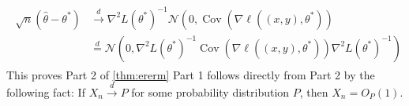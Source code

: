 \documentclass{article}
\begin{document}
\begin{align*}
\begin{aligned}
\sqrt{n}\left(\hat{\theta}-\theta^{*}\right) & \stackrel{d}{\rightarrow} \nabla^{2} L\left(\theta^{*}\right)^{-1} \mathcal{N}\left(0, \operatorname{Cov}\left(\nabla\ell\left((x, y), \theta^{*}\right)\right)\right.\\
& \stackrel{d}{=} \mathcal{N}\left(0, \nabla^{2} L\left(\theta^{*}\right)^{-1} \operatorname{Cov}\left(\nabla\ell\left((x, y), \theta^{*}\right)\right) \nabla^{2} L\left(\theta^{*}\right)^{-1}\right)
\end{aligned}
\end{align*}
This proves Part 2 of \cref{thm:ererm}
Part 1 follows directly from Part 2 by the following fact: If $X_{n} \stackrel{d}{\rightarrow} P$ for some probability distribution $P$, then $X_{n}=O_{P}(1)$.
\end{document}
